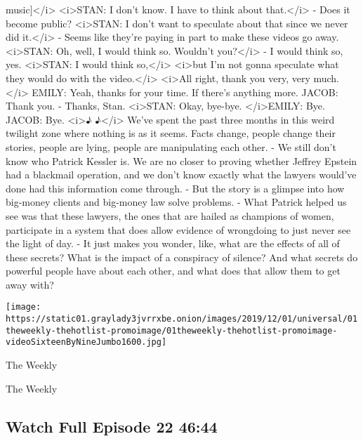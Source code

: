 \begin{itemize}
\begin{itemize}
    music{]}\textless{}/i\textgreater{} \textless{}i\textgreater{}STAN:
    I don't know. I have to think about that.\textless{}/i\textgreater{}
    - Does it become public? \textless{}i\textgreater{}STAN: I don't
    want to speculate about that since we never did
    it.\textless{}/i\textgreater{} - Seems like they're paying in part
    to make these videos go away. \textless{}i\textgreater{}STAN: Oh,
    well, I would think so. Wouldn't you?\textless{}/i\textgreater{} - I
    would think so, yes. \textless{}i\textgreater{}STAN: I would think
    so,\textless{}/i\textgreater{} \textless{}i\textgreater{}but I'm not
    gonna speculate what they would do with the
    video.\textless{}/i\textgreater{} \textless{}i\textgreater{}All
    right, thank you very, very much.\textless{}/i\textgreater{} EMILY:
    Yeah, thanks for your time. If there's anything more. JACOB: Thank
    you. - Thanks, Stan. \textless{}i\textgreater{}STAN: Okay, bye-bye.
    \textless{}/i\textgreater{}EMILY: Bye. JACOB: Bye.
    \textless{}i\textgreater{}♪ ♪\textless{}/i\textgreater{} We've spent
    the past three months in this weird twilight zone where nothing is
    as it seems. Facts change, people change their stories, people are
    lying, people are manipulating each other. - We still don't know who
    Patrick Kessler is. We are no closer to proving whether Jeffrey
    Epstein had a blackmail operation, and we don't know exactly what
    the lawyers would've done had this information come through. - But
    the story is a glimpse into how big-money clients and big-money law
    solve problems. - What Patrick helped us see was that these lawyers,
    the ones that are hailed as champions of women, participate in a
    system that does allow evidence of wrongdoing to just never see the
    light of day. - It just makes you wonder, like, what are the effects
    of all of these secrets? What is the impact of a conspiracy of
    silence? And what secrets do powerful people have about each other,
    and what does that allow them to get away with?
  \end{itemize}
\end{itemize}

\texttt{[image: https://static01.graylady3jvrrxbe.onion/images/2019/12/01/universal/01theweekly-thehotlist-promoimage/01theweekly-thehotlist-promoimage-videoSixteenByNineJumbo1600.jpg]}

The Weekly

The Weekly

\hypertarget{watch-full-episode-22-4644}{%
\subsection{Watch Full Episode 22
46:44}\label{watch-full-episode-22-4644}}

